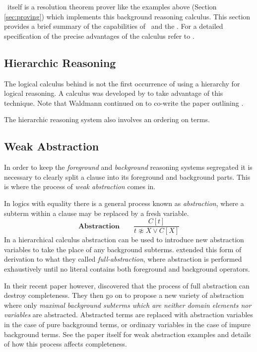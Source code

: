 \Beagle\ itself is a resolution theorem prover like the examples above (Section \ref{sec:proving})
which implements this background reasoning calculus. This section provides a brief
summary of the capabilities of \beagle\ and the \HSWAC. For a detailed specification
of the precise advantages of the calculus refer to \cite{baum13}.

\subsection{Hierarchic Reasoning}
\label{sec:hier}
The logical calculus behind {\beagle} is not the first occurrence of using a hierarchy for
logical reasoning. A calculus was developed by  to take advantage
of this technique. Note that Waldmann continued on to co-write the paper outlining
{\HSWA} \cite{baum13}.

The hierarchic reasoning system also involves an ordering on terms.

\subsection{Weak Abstraction}
In order to keep the \emph{foreground} and \emph{background} reasoning
systems segregated it is necessary to clearly split a clause into its foreground
and background parts. This is where the process of \emph{weak abstraction} comes in.

In logics with equality there is a general process known as \emph{abstraction},
where a subterm within a clause may be replaced by a fresh variable.
\[\textbf{Abstraction}\quad\quad \frac{C[t]}{t\not\approx X \lor C[X]}\]
In a hierarchical calculus abstraction can be used to introduce new abstraction variables to take the place
of any background subterms.  extended this form of derivation to what they called \emph{full-abstraction},
where abstraction is performed exhaustively until no literal contains both foreground
and background operators.

In their recent paper however,  discovered that the process 
of full abstraction can destroy completeness. They then go on to propose a new
variety of abstraction where only \emph{maximal background subterms which are
neither domain elements nor variables} are abstracted. Abstracted terms are replaced
with abstraction variables in the case of pure background terms, or ordinary variables
in the case of impure background terms. See the paper itself for weak abstraction
examples and details of how this process affects completeness.

